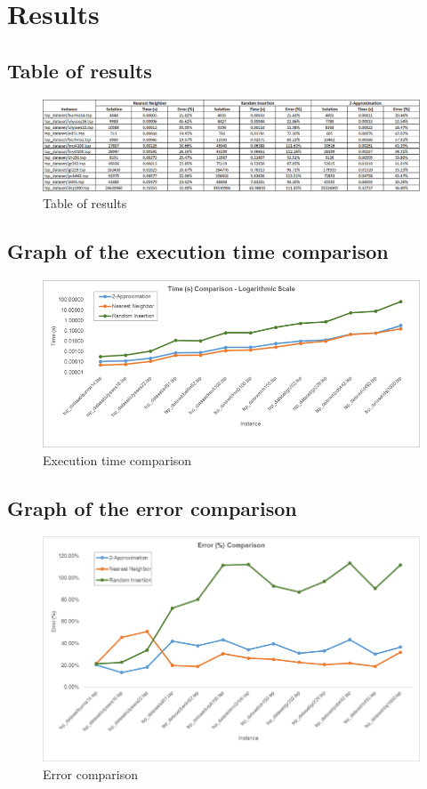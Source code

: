 \section{Results}\label{results}

\subsection{Table of results}

	\begin{figure}[H]
		\hspace{0cm}\includegraphics[width=17cm]{Img/resultstable.png}
		\caption{Table of results}
	\end{figure}

\subsection{Graph of the execution time comparison}
	
	\begin{figure}[H]
		\hspace{0cm}\includegraphics[width=17cm]{Img/timecomparisonchart.png}
		\caption{Execution time comparison}
	\end{figure}
	

\subsection{Graph of the error comparison}
	
	\begin{figure}[H]
		\hspace{0cm}\includegraphics[width=17cm]{Img/errorcomparisonchart.png}
		\caption{Error comparison}
	\end{figure}


\pagebreak